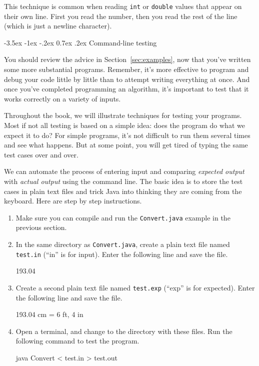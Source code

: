 \documentclass[12pt]{book}
\makeatletter
\theoremstyle{exercise}
\newcommand{\java}[1]{\verb"#1"}
\renewcommand{\section}{\@startsection{section}{1}{\z@}%
    {-3.5ex \@plus -1ex \@minus -.2ex}%
    {0.7ex \@plus.2ex}%
    {\normalfont\Large\bfseries}}
\newcommand{\java}[1]{\lstinline{#1}} %
\makeatother
\begin{document}
This technique is common when reading \java{int} or \java{double} values that appear on their own line.
First you read the number, then you read the rest of the line (which is just a newline character).


\section{Command-line testing}

You should review the advice in Section~\ref{sec:examples}, now that you've written some more substantial programs.
Remember, it's more effective to program and debug your code little by little than to attempt writing everything at once.
And once you've completed programming an algorithm, it's important to test that it works correctly on a variety of inputs.

Throughout the book, we will illustrate techniques for testing your programs.
Most if not all testing is based on a simple idea: does the program do what we expect it to do?
For simple programs, it's not difficult to run them several times and see what happens.
But at some point, you will get tired of typing the same test cases over and over.

We can automate the process of entering input and comparing {\em expected output} with {\em actual output} using the command line.
The basic idea is to store the test cases in plain text files and trick Java into thinking they are coming from the keyboard.
Here are step by step instructions.

\begin{enumerate}

\item Make sure you can compile and run the {\tt Convert.java} example in the previous section.

\item In the same directory as {\tt Convert.java}, create a plain text file named {\tt test.in} (``in'' is for input).
Enter the following line and save the file.

\begin{stdout}
193.04
\end{stdout}

\item Create a second plain text file named {\tt test.exp} (``exp'' is for expected).
Enter the following line and save the file.

\begin{stdout}
193.04 cm = 6 ft, 4 in
\end{stdout}

\item Open a terminal, and change to the directory with these files.
Run the following command to test the program.

\begin{stdout}
java Convert < test.in > test.out
\end{stdout}

\end{enumerate}
\end{document}
